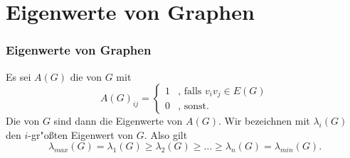 \documentclass{beamer}
\begin{document}
\section{Eigenwerte von Graphen}
\begin{frame}[<+->]
  \frametitle{Eigenwerte von Graphen}
  Es sei $A(G)$ die  von $G$ mit 
  $$A(G)_{ij} = \begin{cases}
    1 & \text{, falls } v_iv_j \in E(G) \\
    0 & \text{, sonst.}
  \end{cases}$$
  \pause
  Die  von $G$ sind dann die Eigenwerte von $A(G)$. 
  \pause
  Wir bezeichnen mit $\lambda_{i}(G)$ den $i$-gr"o{\ss}ten Eigenwert von $G$. Also gilt 
  $$\lambda_{max}(G) = \lambda_{1}(G) \geq \lambda_{2}(G) \geq \dots \geq \lambda_{n}(G) = \lambda_{min}(G).$$
\end{frame}
\end{document}
